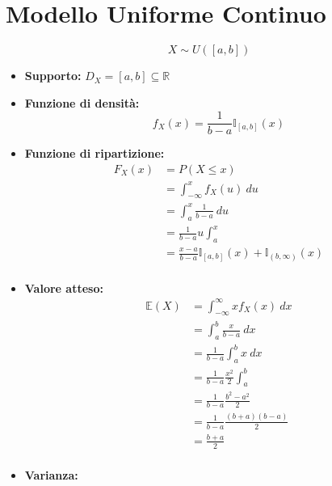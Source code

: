 \documentclass[11pt]{report}
\begin{document}
\section{Modello Uniforme Continuo}
\begin{equation}
    X \sim U([a,b])
\end{equation}
\begin{itemize}
	\item \textbf{Supporto:} $D_X=[a,b]\subseteq \mathbb{R}$
    \item \textbf{Funzione di densità:}
    \begin{equation}
        f_X(x) = \frac{1}{b-a} \mathbb{I}_{[a,b]}(x)
    \end{equation}
    \item \textbf{Funzione di ripartizione:}
    \begin{equation}
    	\begin{split}
   			F_X(x) & = P(X \leq x)\\
            & = \int_{-\infty}^x f_X(u)\ du\\
            & = \int_a^x \frac{1}{b-a}\ du\\
            & = \frac{1}{b-a} u \int_a^x\\
            & = \frac{x-a}{b-a} \mathbb{I}_{[a,b]}(x) + \mathbb{I}_{(b, \infty)}(x)\\
		\end{split}
    \end{equation}
    \item \textbf{Valore atteso:}
    \begin{equation}
    	\begin{split}
   			\mathbb{E}(X) & = \int_{-\infty}^\infty x f_X(x)\ dx\\
            & = \int_a^b \frac{x}{b-a}\ dx\\
            & = \frac{1}{b-a} \int_a^b x\ dx\\
            & = \frac{1}{b-a} \frac{x^2}{2} \int_a^b\\
            & = \frac{1}{b-a} \frac{b^2 - a^2}{2}\\
            & = \frac{1}{b-a} \frac{(b+a)(b-a)}{2}\\
            & = \frac{b+a}{2}\\
		\end{split}
    \end{equation}
    \item \textbf{Varianza:}
    \begin{equation}
    	\begin{split}

\end{split}
\end{equation}
\end{itemize}
\end{document}
